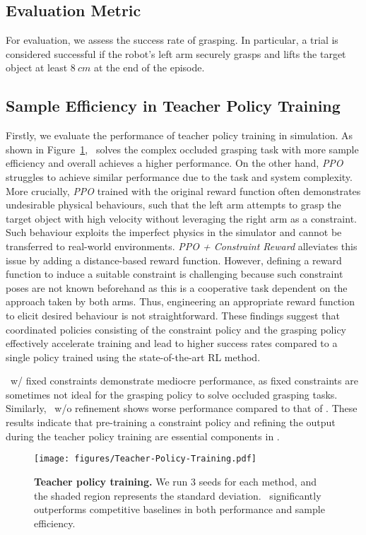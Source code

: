 \subsection{Evaluation Metric}
For evaluation, we assess the success rate of grasping. 
In particular, a trial is considered successful if the robot's left arm securely grasps and lifts the target object at least $8 \ cm$ at the end of the episode.

\subsection{Sample Efficiency in Teacher Policy Training}
Firstly, we evaluate the performance of teacher policy training in simulation.
As shown in Figure~\ref{fig:teacher_policy}, \ourmethod~solves the complex occluded grasping task with more sample efficiency and overall achieves a higher performance. 
On the other hand, \emph{PPO} struggles to achieve similar performance due to the task and system complexity.
More crucially, \emph{PPO} trained with the original reward function often demonstrates undesirable physical behaviours, such that the left arm attempts to grasp the target object with high velocity without leveraging the right arm as a constraint.
Such behaviour exploits the imperfect physics in the simulator and cannot be transferred to real-world environments.
\emph{PPO + Constraint Reward} alleviates this issue by adding a distance-based reward function.
However, defining a reward function to induce a suitable constraint is challenging because such constraint poses are not known beforehand as this is a cooperative task dependent on the approach taken by both arms.
Thus, engineering an appropriate reward function to elicit desired behaviour is not straightforward.
These findings suggest that coordinated policies consisting of the constraint policy and the grasping policy effectively accelerate training and lead to higher success rates compared to a single policy trained using the state-of-the-art RL method.

\ourmethod~w/ fixed constraints demonstrate mediocre performance, as fixed constraints are sometimes not ideal for the grasping policy to solve occluded grasping tasks.
Similarly, \ourmethod~w/o refinement shows worse performance compared to that of \ourmethod.
These results indicate that pre-training a constraint policy and refining the output during the teacher policy training are essential components in \ourmethod.

\begin{figure}
    \centering
    \texttt{[image: figures/Teacher-Policy-Training.pdf]}
    \caption{\textbf{Teacher policy training.} We run $3$ seeds for each method, and the shaded region represents the standard deviation. \ourmethod~significantly outperforms competitive baselines in both performance and sample efficiency.}
    \label{fig:teacher_policy}
\end{figure}

